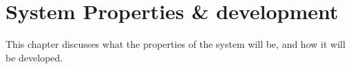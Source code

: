 \chapter{System Properties \& development}
This chapter discusses what the properties of the system will be, and how it will be developed.


